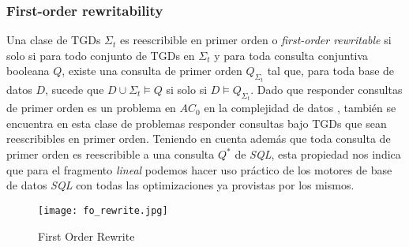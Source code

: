 \documentclass[11pt,a4paper,twoside]{tesis}
\begin{document}
\subsubsection{First-order rewritability}
Una clase de TGDs $\Sigma_t$ es reescribible en primer orden o \textit{first-order rewritable} si solo si para todo conjunto de TGDs en $\Sigma_t$ y para toda consulta conjuntiva booleana $Q$, existe una consulta de primer orden $Q_{\Sigma_t}$ tal que, para toda base de datos $D$, sucede que $D \cup \Sigma_t \models Q$ si solo si $D \models Q_{\Sigma_t}$. Dado que responder consultas de primer orden es un problema en $AC_0$ en la complejidad de datos \cite{Vardi}, también se encuentra en esta clase de problemas responder consultas bajo TGDs que sean reescribibles en primer orden. Teniendo en cuenta además que toda consulta de primer orden es reescribible a una consulta $Q^*$ de \textit{SQL}, esta propiedad nos indica que para el fragmento \textit{lineal} podemos hacer uso práctico de los motores de base de datos \textit{SQL} con todas las optimizaciones ya provistas por los mismos.

\begin{figure}[ht]
    \texttt{[image: fo\_rewrite.jpg]}
    \centering
    \caption{First Order Rewrite}
    \label{fig:fo_rewrite}
\end{figure}
\end{document}
